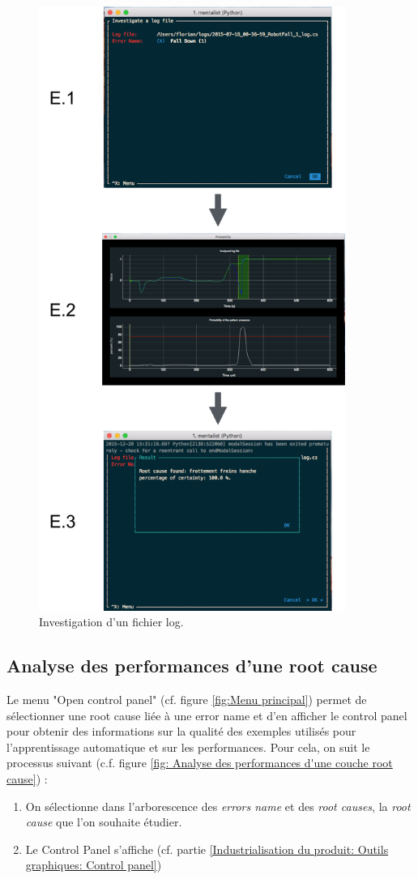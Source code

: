 \begin{figure}[H]
	\centering\includegraphics[width=10cm]{images/invest_menu.png}
	\caption[Investigation d'un fichier log]{Investigation d'un fichier log.}
	\label{fig: Investigation d'un fichier log}
\end{figure} 

\subsection{Analyse des performances d'une  root cause}
\label{Industrialisation du produit: Utilisation suggérée des outils: Analyse des performances d'une  root cause}
Le menu "Open control panel" (cf. figure \ref{fig:Menu principal}) permet de sélectionner une root cause liée à une error name et d'en afficher le control panel pour obtenir des informations sur la qualité des exemples utilisés pour l'apprentissage automatique et sur les performances. Pour cela, on suit le processus suivant (c.f. figure \ref{fig: Analyse des performances d'une couche root cause}) : 
\begin{enumerate}
	\item On sélectionne dans l'arborescence des \emph{errors name} et des\emph{ root causes}, la \emph{root cause} que l'on souhaite étudier.
	\item Le Control Panel s'affiche (cf. partie \ref{Industrialisation du produit: Outils graphiques: Control panel})
\end{enumerate}

